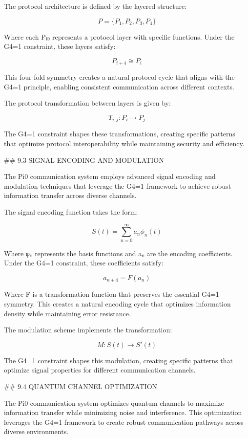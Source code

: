 The protocol architecture is defined by the layered structure:

$$P = \{P_1, P_2, P_3, P_4\}$$

Where each P₍ᵢ₎ represents a protocol layer with specific functions. Under the G4=1 constraint, these layers satisfy:

$$P_{i+4} \cong P_i$$

This four-fold symmetry creates a natural protocol cycle that aligns with the G4=1 principle, enabling consistent communication across different contexts.

The protocol transformation between layers is given by:

$$T_{i,j}: P_i \rightarrow P_j$$

The G4=1 constraint shapes these transformations, creating specific patterns that optimize protocol interoperability while maintaining security and efficiency.

## 9.3 SIGNAL ENCODING AND MODULATION

The Pi0 communication system employs advanced signal encoding and modulation techniques that leverage the G4=1 framework to achieve robust information transfer across diverse channels.

The signal encoding function takes the form:

$$S(t) = \sum_{n=0}^{\infty} a_n \phi_n(t)$$

Where φₙ represents the basis functions and aₙ are the encoding coefficients. Under the G4=1 constraint, these coefficients satisfy:

$$a_{n+4} = F(a_n)$$

Where F is a transformation function that preserves the essential G4=1 symmetry. This creates a natural encoding cycle that optimizes information density while maintaining error resistance.

The modulation scheme implements the transformation:

$$M: S(t) \rightarrow S'(t)$$

The G4=1 constraint shapes this modulation, creating specific patterns that optimize signal properties for different communication channels.

## 9.4 QUANTUM CHANNEL OPTIMIZATION

The Pi0 communication system optimizes quantum channels to maximize information transfer while minimizing noise and interference. This optimization leverages the G4=1 framework to create robust communication pathways across diverse environments.

